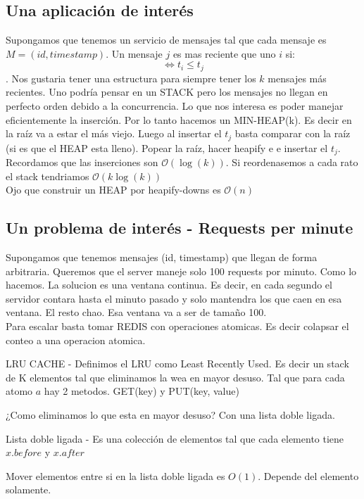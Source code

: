 \subsection{Una aplicación de interés}
Supongamos que tenemos un servicio de mensajes tal que cada mensaje es $M = (id, timestamp)$. Un mensaje $j$ es mas reciente que uno $i$ si:
$$\iff t_i \leq t_j $$.
Nos gustaria tener una estructura para siempre tener los $k$ mensajes más recientes. Uno podría pensar en un STACK pero los mensajes no llegan en 
perfecto orden debido a la concurrencia. Lo que nos interesa es poder manejar eficientemente la inserción. Por lo tanto hacemos un MIN-HEAP(k). Es decir
en la raíz va a estar el más viejo. Luego al insertar el $t_j$ basta comparar con la raíz (si es que el HEAP esta lleno). Popear la raíz, hacer heapify e 
e insertar el $t_j$. Recordamos que las inserciones son $\mathcal{O}(\log(k))$. Si reordenasemos a cada rato el stack tendriamos $\mathcal{O}(k \log (k))$
\\
Ojo que construir un HEAP por heapify-downs es $\mathcal{O}(n)$

\subsection{Un problema de interés - Requests per minute}
Supongamos que tenemos mensajes (id, timestamp) que llegan de forma arbitraria. 
Queremos que el server maneje solo 100 requests por minuto. Como lo hacemos.
La solucion es una ventana continua. Es decir, en cada segundo el servidor contara hasta el minuto pasado 
y solo mantendra los que caen en esa ventana. El resto chao. Esa ventana va a ser de tamaño 100. 
\\
Para escalar basta tomar REDIS con operaciones atomicas. Es decir colapsar el conteo a una operacion atomica.

\begin{Definition}{LRU CACHE}
    - Definimos el LRU como Least Recently Used. Es decir un stack de K elementos tal que
    eliminamos la wea en mayor desuso. Tal que para cada atomo $a$ hay 2 metodos.
    GET(key) y PUT(key, value)
\end{Definition}
¿Como eliminamos lo que esta en mayor desuso? Con una lista doble ligada. 

\begin{Definition}{Lista doble ligada}
    - Es una colección de elementos tal que cada elemento tiene $x.before$ y $x.after$
\end{Definition}
Mover elementos entre si en la lista doble ligada es $O(1)$. Depende del elemento solamente.


